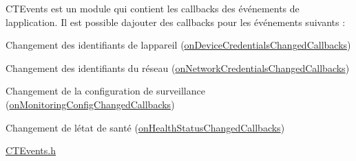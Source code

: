 CTEvents est un module qui contient les callbacks des événements de l\textquotesingle{}application. Il est possible d\textquotesingle{}ajouter des callbacks pour les événements suivants \+:


\begin{DoxyItemize}
\item Changement des identifiants de l\textquotesingle{}appareil (\mbox{\hyperlink{_c_t_events_8h_a75ad50aeb7a689d1d0d8451bf056d267}{on\+Device\+Credentials\+Changed\+Callbacks}})
\item Changement des identifiants du réseau (\mbox{\hyperlink{_c_t_events_8h_ac3d37fa308a4896ebc16da9aa6fd9f8b}{on\+Network\+Credentials\+Changed\+Callbacks}})
\item Changement de la configuration de surveillance (\mbox{\hyperlink{_c_t_events_8h_a53a1ac7c3b2ab250fb67d1078b1fbf79}{on\+Monitoring\+Config\+Changed\+Callbacks}})
\item Changement de l\textquotesingle{}état de santé (\mbox{\hyperlink{_c_t_events_8h_a1c0ee0a85d3b421c6deef40d30fe0b30}{on\+Health\+Status\+Changed\+Callbacks}})
\end{DoxyItemize}

\mbox{\hyperlink{_c_t_events_8h}{CTEvents.\+h}} 